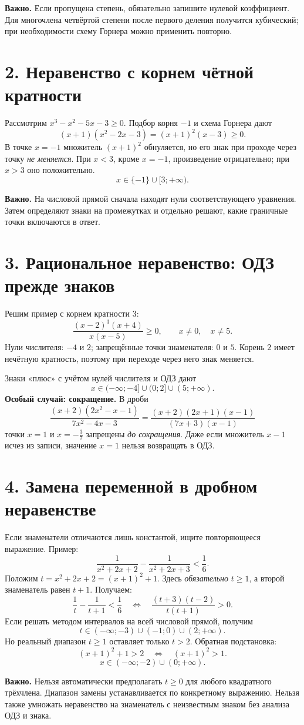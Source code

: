 \documentclass[a4paper,12pt]{article}
\newcommand{\lessonsection}[1]{\vspace{0.3em}\section*{\color{darkaccent}#1}\vspace{-0.75em}{\color{accent}\rule{\linewidth}{0.5pt}}\vspace{0.18em}}
\newcommand{\note}[1]{\par\smallskip\textbf{Важно.} #1\par}
\begin{document}
\note{Если пропущена степень, обязательно запишите нулевой коэффициент. Для многочлена четвёртой степени после первого деления получится кубический; при необходимости схему Горнера можно применить повторно.}

\lessonsection{2. Неравенство с корнем чётной кратности}
Рассмотрим $x^3-x^2-5x-3\ge0$. Подбор корня $-1$ и схема Горнера дают
\[
(x+1)(x^2-2x-3)=(x+1)^2(x-3)\ge0.
\]
В точке $x=-1$ множитель $(x+1)^2$ обнуляется, но его знак при проходе через точку \emph{не меняется}. При $x<3$, кроме $x=-1$, произведение отрицательно; при $x>3$ оно положительно.
\[
\boxed{x\in\{-1\}\cup[3;+\infty).}
\]
\note{На числовой прямой сначала находят нули соответствующего уравнения. Затем определяют знаки на промежутках и отдельно решают, какие граничные точки включаются в ответ.}

\lessonsection{3. Рациональное неравенство: ОДЗ прежде знаков}
Решим пример с корнем кратности $3$:
\[
\frac{(x-2)^3(x+4)}{x(x-5)}\ge0,
\qquad x\ne0,\quad x\ne5.
\]
Нули числителя: $-4$ и $2$; запрещённые точки знаменателя: $0$ и $5$. Корень $2$ имеет нечётную кратность, поэтому при переходе через него знак меняется.
\begin{center}
\end{center}
Знаки «плюс» с учётом нулей числителя и ОДЗ дают
\[
\boxed{x\in(-\infty;-4]\cup(0;2]\cup(5;+\infty).}
\]
\textbf{Особый случай: сокращение.} В дроби
\[
\frac{(x+2)(2x^2-x-1)}{7x^2-4x-3}
=\frac{(x+2)(2x+1)(x-1)}{(7x+3)(x-1)}
\]
точки $x=1$ и $x=-\frac37$ запрещены \emph{до сокращения}. Даже если множитель $x-1$ исчез из записи, значение $x=1$ нельзя возвращать в ОДЗ.

\lessonsection{4. Замена переменной в дробном неравенстве}
Если знаменатели отличаются лишь константой, ищите повторяющееся выражение. Пример:
\[
\frac{1}{x^2+2x+2}-\frac{1}{x^2+2x+3}<\frac16.
\]
Положим $t=x^2+2x+2=(x+1)^2+1$. Здесь \emph{обязательно} $t\ge1$, а второй знаменатель равен $t+1$. Получаем:
\[
\frac1t-\frac1{t+1}<\frac16
\quad\Longleftrightarrow\quad
\frac{(t+3)(t-2)}{t(t+1)}>0.
\]
Если решать методом интервалов на всей числовой прямой, получим
\[
t\in(-\infty;-3)\cup(-1;0)\cup(2;+\infty).
\]
Но реальный диапазон $t\ge1$ оставляет только $t>2$. Обратная подстановка:
\[
(x+1)^2+1>2 \quad\Longleftrightarrow\quad
(x+1)^2>1.
\]
\[
\boxed{x\in(-\infty;-2)\cup(0;+\infty).}
\]
\note{Нельзя автоматически предполагать $t\ge0$ для любого квадратного трёхчлена. Диапазон замены устанавливается по конкретному выражению. Нельзя также умножать неравенство на знаменатель с неизвестным знаком без анализа ОДЗ и знака.}
\end{document}
